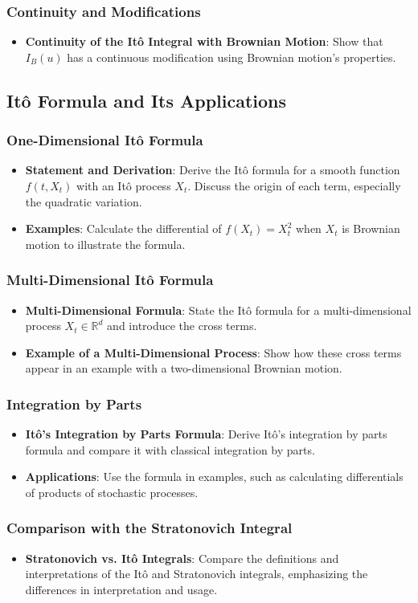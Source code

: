 \subsubsection{Continuity and Modifications}
\begin{itemize}
    \item \textbf{Continuity of the Itô Integral with Brownian Motion}: Show that $I_B(u)$ has a continuous modification using Brownian motion’s properties.
\end{itemize}

\subsection{Itô Formula and Its Applications}

\subsubsection{One-Dimensional Itô Formula}
\begin{itemize}
    \item \textbf{Statement and Derivation}: Derive the Itô formula for a smooth function $f(t, X_t)$ with an Itô process $X_t$. Discuss the origin of each term, especially the quadratic variation.
    \item \textbf{Examples}: Calculate the differential of $f(X_t) = X_t^2$ when $X_t$ is Brownian motion to illustrate the formula.
\end{itemize}

\subsubsection{Multi-Dimensional Itô Formula}
\begin{itemize}
    \item \textbf{Multi-Dimensional Formula}: State the Itô formula for a multi-dimensional process $X_t \in \mathbb{R}^d$ and introduce the cross terms.
    \item \textbf{Example of a Multi-Dimensional Process}: Show how these cross terms appear in an example with a two-dimensional Brownian motion.
\end{itemize}

\subsubsection{Integration by Parts}
\begin{itemize}
    \item \textbf{Itô’s Integration by Parts Formula}: Derive Itô’s integration by parts formula and compare it with classical integration by parts.
    \item \textbf{Applications}: Use the formula in examples, such as calculating differentials of products of stochastic processes.
\end{itemize}

\subsubsection{Comparison with the Stratonovich Integral}
\begin{itemize}
    \item \textbf{Stratonovich vs. Itô Integrals}: Compare the definitions and interpretations of the Itô and Stratonovich integrals, emphasizing the differences in interpretation and usage.
\end{itemize}


